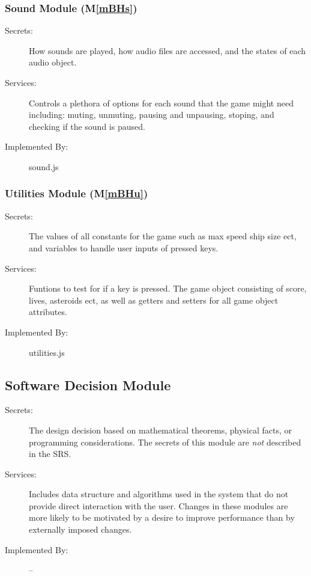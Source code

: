 \documentclass[12pt, titlepage]{article}
\newcommand{\mref}[1]{M\ref{#1}}
\begin{document}
\subsubsection{Sound Module (\mref{mBHs})}
\begin{description}
\item[Secrets:] How sounds are played, how audio files are accessed, and the states of each audio object.
\item[Services:] Controls a plethora of options for each sound that the game might need including: muting, unmuting, pausing and unpausing, stoping, and checking if the sound is paused.
\item[Implemented By:] sound.js
\end{description}

\subsubsection{Utilities Module (\mref{mBHu})}
\begin{description}
\item[Secrets:]The values of all constants for the game such as max speed ship size ect, and variables to handle user inputs of pressed keys.
\item[Services:] Funtions to test for if a key is pressed. The game object consisting of score, lives, asteroids ect, as well as getters and setters for all game object attributes.
\item[Implemented By:] utilities.js
\end{description}


\subsection{Software Decision Module}

\begin{description}
\item[Secrets:] The design decision based on mathematical theorems, physical
  facts, or programming considerations. The secrets of this module are
  \emph{not} described in the SRS.
\item[Services:] Includes data structure and algorithms used in the system that
  do not provide direct interaction with the user.
   Changes in these modules are more likely to be motivated by a desire to
   improve performance than by externally imposed changes.
\item[Implemented By:] --
\end{description}
\end{document}
